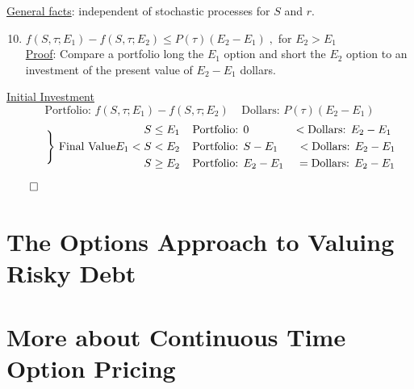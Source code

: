 \documentclass[
14pt,notheorems,hyperref={pdfauthor=whatever}
]{beamer}
\begin{document}
\begin{frame}
\underline{General facts}: independent of stochastic processes for $S$ and $r$.\\
\hfill
\begin{enumerate}
    \setcounter{enumi}{9}
    \item $f(S,\tau;E_1)-f(S,\tau;E_2) \leq P(\tau)(E_2-E_1)\;,$ for $E_2>E_1$\\
    \hfill\break
    \underline{Proof}: Compare a portfolio long the $E_1$ option and short the $E_2$ option to an investment of the present value of $E_2-E_1$ dollars.\\
    \hfill
\end{enumerate}
\underline{Initial Investment}
\[\text{Portfolio: } f(S,\tau;E_1)-f(S,\tau;E_2) \;\;\;\; \text{Dollars: } P(\tau)(E_2-E_1)\]
\begin{align*} \tag*{\Bigg\} Final Value}
\begin{split}
    S &\leq E_1 \;\;\;\; \text{Portfolio: } 0 \;\;\;\;\;\;\;\;\;\;\;\;\;\;< \text{Dollars: } E_2-E_1
    \\
    E_1 < S &< E_2 \;\;\;\; \text{Portfolio: } S-E_1 \;\;\;\;\;\;< \text{Dollars: } E_2-E_1
    \\
    S &\geq E_2 \;\;\;\; \text{Portfolio: } E_2-E_1 \;\;\;\;= \text{Dollars: } E_2-E_1
    \\
\end{split}
\end{align*}
\hfill$\qed$
\end{frame}

\section{The Options Approach to Valuing Risky Debt}


\section{More about Continuous Time Option Pricing}

\end{document}

